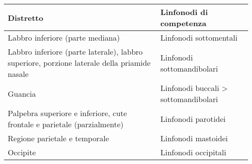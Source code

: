 \documentclass[italian,]{article}
\begin{document}
\begin{longtable}[]{@{}ll@{}}
\toprule
\begin{minipage}[b]{0.47\columnwidth}\raggedright
Distretto\strut
\end{minipage} & \begin{minipage}[b]{0.47\columnwidth}\raggedright
Linfonodi di competenza\strut
\end{minipage}\tabularnewline
\midrule
\endhead
\begin{minipage}[t]{0.47\columnwidth}\raggedright
Labbro inferiore (parte mediana)\strut
\end{minipage} & \begin{minipage}[t]{0.47\columnwidth}\raggedright
Linfonodi sottomentali\strut
\end{minipage}\tabularnewline
\begin{minipage}[t]{0.47\columnwidth}\raggedright
Labbro inferiore (parte laterale), labbro superiore, porzione laterale
della priamide nasale\strut
\end{minipage} & \begin{minipage}[t]{0.47\columnwidth}\raggedright
Linfonodi sottomandibolari\strut
\end{minipage}\tabularnewline
\begin{minipage}[t]{0.47\columnwidth}\raggedright
Guancia\strut
\end{minipage} & \begin{minipage}[t]{0.47\columnwidth}\raggedright
Linfonodi buccali \textgreater{} sottomandibolari\strut
\end{minipage}\tabularnewline
\begin{minipage}[t]{0.47\columnwidth}\raggedright
Palpebra superiore e inferiore, cute frontale e parietale
(parzialmente)\strut
\end{minipage} & \begin{minipage}[t]{0.47\columnwidth}\raggedright
Linfonodi parotidei\strut
\end{minipage}\tabularnewline
\begin{minipage}[t]{0.47\columnwidth}\raggedright
Regione parietale e temporale\strut
\end{minipage} & \begin{minipage}[t]{0.47\columnwidth}\raggedright
Linfonodi mastoidei\strut
\end{minipage}\tabularnewline
\begin{minipage}[t]{0.47\columnwidth}\raggedright
Occipite\strut
\end{minipage} & \begin{minipage}[t]{0.47\columnwidth}\raggedright
Linfonodi occipitali\strut
\end{minipage}\tabularnewline
\bottomrule
\end{longtable}
\end{document}
